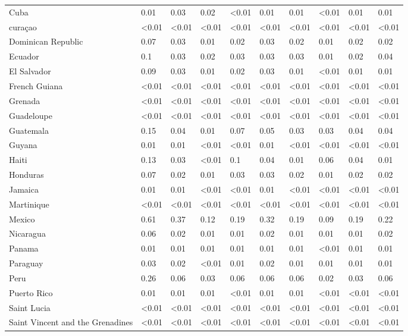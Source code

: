 \begin{longtable}[t]{llllllllll}
Cuba & 0.01 & 0.03 & 0.02 & <0.01 & 0.01 & 0.01 & <0.01 & 0.01 & 0.01\\
curaçao & <0.01 & <0.01 & <0.01 & <0.01 & <0.01 & <0.01 & <0.01 & <0.01 & <0.01\\
\addlinespace
Dominican Republic & 0.07 & 0.03 & 0.01 & 0.02 & 0.03 & 0.02 & 0.01 & 0.02 & 0.02\\
Ecuador & 0.1 & 0.03 & 0.02 & 0.03 & 0.03 & 0.03 & 0.01 & 0.02 & 0.04\\
El Salvador & 0.09 & 0.03 & 0.01 & 0.02 & 0.03 & 0.01 & <0.01 & 0.01 & 0.01\\
French Guiana & <0.01 & <0.01 & <0.01 & <0.01 & <0.01 & <0.01 & <0.01 & <0.01 & <0.01\\
Grenada & <0.01 & <0.01 & <0.01 & <0.01 & <0.01 & <0.01 & <0.01 & <0.01 & <0.01\\
\addlinespace
Guadeloupe & <0.01 & <0.01 & <0.01 & <0.01 & <0.01 & <0.01 & <0.01 & <0.01 & <0.01\\
Guatemala & 0.15 & 0.04 & 0.01 & 0.07 & 0.05 & 0.03 & 0.03 & 0.04 & 0.04\\
Guyana & 0.01 & 0.01 & <0.01 & <0.01 & 0.01 & <0.01 & <0.01 & <0.01 & <0.01\\
Haiti & 0.13 & 0.03 & <0.01 & 0.1 & 0.04 & 0.01 & 0.06 & 0.04 & 0.01\\
Honduras & 0.07 & 0.02 & 0.01 & 0.03 & 0.03 & 0.02 & 0.01 & 0.02 & 0.02\\
\addlinespace
Jamaica & 0.01 & 0.01 & <0.01 & <0.01 & 0.01 & <0.01 & <0.01 & <0.01 & <0.01\\
Martinique & <0.01 & <0.01 & <0.01 & <0.01 & <0.01 & <0.01 & <0.01 & <0.01 & <0.01\\
Mexico & 0.61 & 0.37 & 0.12 & 0.19 & 0.32 & 0.19 & 0.09 & 0.19 & 0.22\\
Nicaragua & 0.06 & 0.02 & 0.01 & 0.01 & 0.02 & 0.01 & 0.01 & 0.01 & 0.02\\
Panama & 0.01 & 0.01 & 0.01 & 0.01 & 0.01 & 0.01 & <0.01 & 0.01 & 0.01\\
\addlinespace
Paraguay & 0.03 & 0.02 & <0.01 & 0.01 & 0.02 & 0.01 & 0.01 & 0.01 & 0.01\\
Peru & 0.26 & 0.06 & 0.03 & 0.06 & 0.06 & 0.06 & 0.02 & 0.03 & 0.06\\
Puerto Rico & 0.01 & 0.01 & 0.01 & <0.01 & 0.01 & 0.01 & <0.01 & <0.01 & <0.01\\
Saint Lucia & <0.01 & <0.01 & <0.01 & <0.01 & <0.01 & <0.01 & <0.01 & <0.01 & <0.01\\
Saint Vincent and the Grenadines & <0.01 & <0.01 & <0.01 & <0.01 & <0.01 & <0.01 & <0.01 & <0.01 & <0.01\\

\end{longtable}
